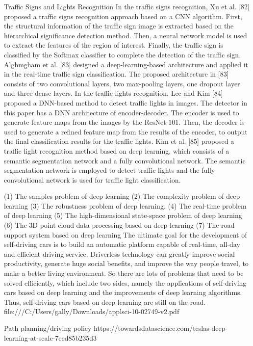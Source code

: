 Traffic Signs and Lights Recognition
In the traffic signs recognition, Xu et al. [82] proposed a traffic signs recognition approach based
on a CNN algorithm. First, the structural information of the traffic sign image is extracted based on the
hierarchical significance detection method. Then, a neural network model is used to extract the features
of the region of interest. Finally, the traffic sign is classified by the Softmax classifier to complete the
detection of the traffic sign. Alghmgham et al. [83] designed a deep-learning-based architecture and
applied it in the real-time traffic sign classification. The proposed architecture in [83] consists of two
convolutional layers, two max-pooling layers, one dropout layer and three dense layers.
In the traffic lights recognition, Lee and Kim [84] proposed a DNN-based method to detect traffic
lights in images. The detector in this paper has a DNN architecture of encoder-decoder. The encoder
is used to generate feature maps from the images by the ResNet-101. Then, the decoder is used to
generate a refined feature map from the results of the encoder, to output the final classification results
for the traffic lights. Kim et al. [85] proposed a traffic light recognition method based on deep learning,
which consists of a semantic segmentation network and a fully convolutional network. The semantic
segmentation network is employed to detect traffic lights and the fully convolutional network is used
for traffic light classification.

(1) The samples problem of deep learning
(2) The complexity problem of deep learning
(3) The robustness problem of deep learning.
(4) The real-time problem of deep learning
(5) The high-dimensional state-space problem of deep learning
(6) The 3D point cloud data processing based on deep learning
(7) The road support system based on deep learning
The ultimate goal for the development of self-driving cars is to build an automatic platform
capable of real-time, all-day and efficient driving service. Driverless technology can greatly improve
social productivity, generate huge social benefits, and improve the way people travel, to make a better
living environment. So there are lots of problems that need to be solved efficiently, which include two
sides, namely the applications of self-driving cars based on deep learning and the improvements of
deep learning algorithms. Thus, self-driving cars based on deep learning are still on the road.
file:///C:/Users/gally/Downloads/applsci-10-02749-v2.pdf

Path planning/driving policy
https://towardsdatascience.com/teslas-deep-learning-at-scale-7eed85b235d3

